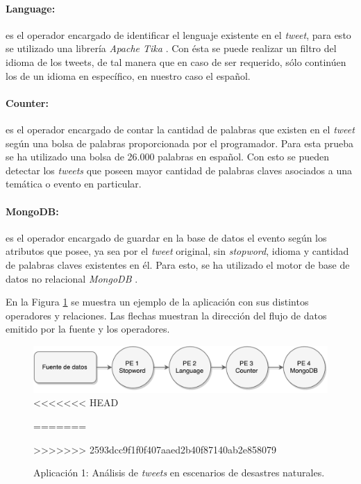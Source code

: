\paragraph{Language:} es el operador encargado de identificar el lenguaje existente en el \textit{tweet}, para esto se utilizado una librer\'ia \textit{Apache Tika} \citep{mattmann2011tika}. Con \'esta se puede realizar un filtro del idioma de los tweets, de tal manera que en caso de ser requerido, s\'olo contin\'uen los de un idioma en espec\'ifico, en nuestro caso el espa\~nol.

\paragraph{Counter:} es el operador encargado de contar la cantidad de palabras que existen en el \textit{tweet} seg\'un una bolsa de palabras proporcionada por el programador. Para esta prueba se ha utilizado una bolsa de 26.000 palabras en espa\~nol. Con esto se pueden detectar los \textit{tweets} que poseen mayor cantidad de palabras claves asociados a una tem\'atica o evento en particular.

\paragraph{MongoDB:} es el operador encargado de guardar en la base de datos el evento seg\'un los atributos que posee, ya sea por el \textit{tweet} original, sin \textit{stopword}, idioma y cantidad de palabras claves existentes en \'el. Para esto, se ha utilizado el motor de base de datos no relacional \textit{MongoDB} \citep{chodorow2013mongodb}.

En la Figura \ref{fig:primeraAplicacion} se muestra un ejemplo de la aplicaci\'on con sus distintos operadores y relaciones. Las flechas muestran la direcci\'on del flujo de datos emitido por la fuente y los operadores.

\begin{figure}[!hb]
	\centering
	\captionsetup{justification=centering}
		\includegraphics[scale=0.6]{images/App1.pdf}
<<<<<<< HEAD
	\caption[Aplicación 1: Análisis de \textit{tweets} en escenarios de desastres naturales.]{Aplicación 1: Análisis de \textit{tweets} en escenarios de desastres naturales.\\Fuente: Elaboración propia.}
=======
	\caption{Aplicaci\'on 1: An\'alisis de \textit{tweets} en escenarios de desastres naturales.}
>>>>>>> 2593dcc9f1f0f407aaed2b40f87140ab2e858079
	\label{fig:primeraAplicacion}
\end{figure}

